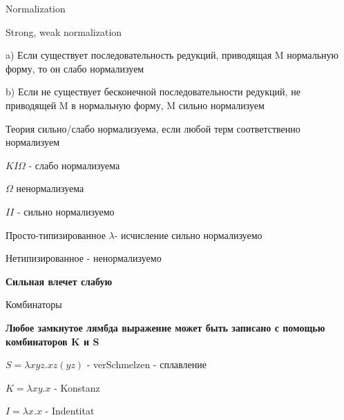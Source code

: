 \begin{para}{Normalization}

\begin{defe}{Strong, weak normalization}

a) Если существует последовательность редукций, приводящая M нормальную форму, то он слабо нормализуем

b) Если не существует бесконечной последовательности редукций, не приводящей M в нормальную форму, M сильно нормализуем

\end{defe}

Теория сильно/слабо нормализуема, если любой терм соответственно нормализуем

\textbf{$KI \Omega$} - слабо нормализуема

$\Omega$ ненормализуема

$II$ - сильно нормализуемо

Просто-типизированное $\lambda$- исчисление сильно нормализуемо

Нетипизированное - ненормализуемо

\textbf{Сильная влечет слабую}

\end{para}

\begin{para}{Комбинаторы}

\textbf{Любое замкнутое лямбда выражение может быть записано с помощью комбинаторов K и S}

$S = \lambda xyz.xz(yz)$ - verSchmelzen - сплавление

$K = \lambda xy.x$ - Konstanz

$I = \lambda x.x$ - Indentitat

\end{para}